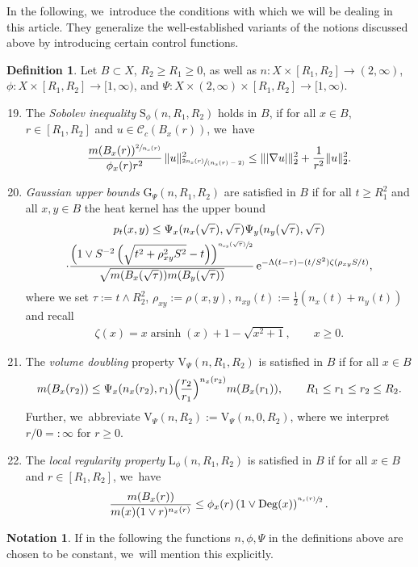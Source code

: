\documentclass[JEP,XML,SOM,Unicode,published]{cedram}
\newenvironment{enumerateA}
{\bgroup\def\theenumi{\Alph{enumi}}\def\theenumii{\arabic{enumii}}\begin{enumerate}}
{\end{enumerate}\egroup}
\newcommand{\spfrac}[2]{\sfrac{#1}{(#2)}}
\newcommand{\rG}{\mathrm{G}}
\newcommand{\rS}{\mathrm{S}}
\newcommand{\rV}{\mathrm{V}}
\newcommand{\rL}{\mathrm{L}}
\theoremstyle{plain}
\theoremstyle{definition}
\newtheorem{definition}[theorem]{Definition}
\newtheorem*{notation}{Notation}
\newcommand{\cC}{\mathcal{C}}
\newcommand{\euler}{\mathrm{e}}
\DeclareMathOperator{\Deg}{Deg}
\DeclareMathOperator{\arsinh}{arsinh}
\begin{document}
In the following, we~introduce the conditions with which we will be dealing in this article. They generalize the well-established variants of {the notions discussed above} by introducing certain control functions.
\begin{definition}\label{def:sobvol} Let $B\subset X$, $R_2\geq R_1\geq 0$, as well as $n\colon X\times [R_1,R_2]\to (2,\infty)$, $\phi\colon X\times [R_1,R_2]\to [1,\infty)$, and ${\Psi}\colon X\times {(2,\infty)}\times [R_1,R_2]\to [1,\infty)$.
\begin{enumerateA}
\setcounter{enumi}{18}
\item\label{S}
The {\em Sobolev inequality} $\rS_\phi(n,R_1,R_2)$ holds in $B$, if for all $x\in B$, $r\in[R_1,R_2]$ {and $u\in\cC_{c}(B_x(r))$}, we~have
\begin{equation*}
\frac{m(B_x(r))^{\sfrac{2}{n_x(r)}}}{\phi_x(r)r^2}\,
\Vert u\Vert_{\spfrac{2n_x(r)}{n_x(r)-2}}^2
\leq \Vert \vert\nabla u\vert\Vert_2^2+\frac{1}{r^2}\Vert u\Vert_2^2.
\end{equation*}

\setcounter{enumi}{6}
\item\label{G} \emph{Gaussian upper bounds} $\rG_\Psi(n,R_1,R_2)$ are satisfied in $ B $ if for all $t\geq R_1^2$ and all $x,y\in B$ the heat kernel has the upper bound
\begin{multline*}
p_{t}(x,y)
\leq {\Psi_x(n_x(\sqrt \tau),\sqrt \tau)\Psi_y(n_y(\sqrt \tau),\sqrt \tau)}
\\
\cdot
\frac{\left(1\vee S^{-2}\left(\sqrt{t^2+\rho_{xy}^2S^2}-t\right)\right)^{\sfrac{n_{xy}(\sqrt \tau)}{2}}}
{\sqrt{m(B_{x}(\sqrt \tau))m(B_{y}(\sqrt \tau))}}\,
\euler^{-\Lambda (t-\tau)-(t/S^2)\zeta\left(\rho_{xy}S/t\right)},
\end{multline*}
where we set {$\tau:=t\wedge R_2^2$}, $ \rho_{xy}:=\rho(x,y) $, $ n_{xy}(t):=\frac12({n_x(t)+n_y(t)}) $
and recall
\begin{align*}
\zeta(x)=x\arsinh(x)+1-\sqrt{x^2+1}, \qquad x\geq 0.
\end{align*}

\setcounter{enumi}{21}
\item\label{V} The \emph{volume doubling} property $\rV_{{\Psi}}(n, R_1,R_2)$ is satisfied in $B$ if for all $x\in B$
\[
m(B_x(r_2))\leq {\Psi_x(n_x(r_2),r_1)}\Bigl(\frac{r_2}{r_1}\Bigr)^{n_x(r_2)} m(B_x(r_1)),\qquad R_1\leq r_1\leq r_2\leq R_2.
\]
Further, we~abbreviate $\rV_{{\Psi}}(n,R_2):=\mathrm{V}_{{\Psi}}(n,0,R_2)$, where we interpret $r/0=:\infty$ for $r\geq 0$.

\setcounter{enumi}{11}
\item\label{L}
The \emph{local regularity property} $\rL_\phi(n,R_1,R_2)$ is satisfied in $ B $ if for all $x\in B$ and $r\in[R_1,R_2]$, we~have
\[
\frac{m(B_x(r))}{m(x)(1\vee r)^{n_x(r)}}
\leq \phi_x(r)\left(1\vee\Deg(x)\right)^{\sfrac{n_x(r)}2}.
\]
\end{enumerateA}
\end{definition}
\begin{notation}
If {in the following} the functions $n,\phi,\Psi$ in the definitions above are chosen to be constant, we~will mention this explicitly.
\end{notation}
\end{document}
